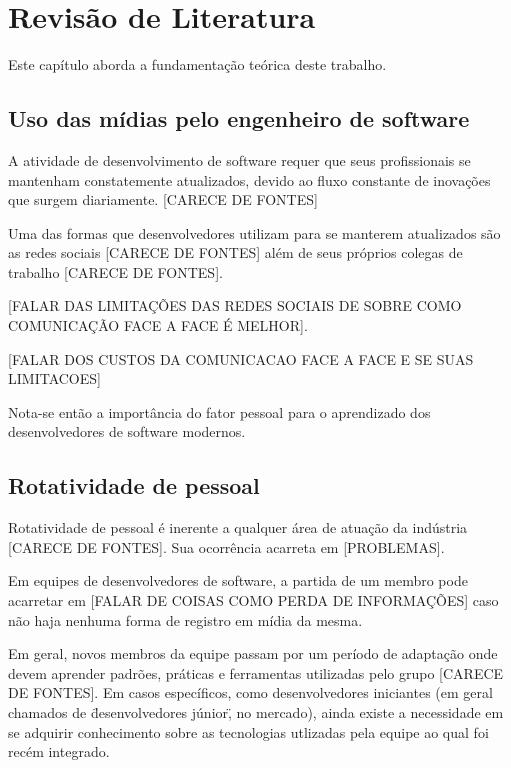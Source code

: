 \chapter{Revisão de Literatura}

Este capítulo aborda a fundamentação teórica deste trabalho.

\section{Uso das mídias pelo engenheiro de software}

A atividade de desenvolvimento de software requer que seus profissionais se mantenham constatemente atualizados, devido ao fluxo constante de inovações que surgem diariamente. [CARECE DE FONTES]

Uma das formas que desenvolvedores utilizam para se manterem atualizados são as redes sociais [CARECE DE FONTES] além de seus próprios colegas de trabalho [CARECE DE FONTES].

[FALAR DAS LIMITAÇÕES DAS REDES SOCIAIS DE SOBRE COMO COMUNICAÇÃO FACE A FACE É MELHOR].

[FALAR DOS CUSTOS DA COMUNICACAO FACE A FACE E SE SUAS LIMITACOES]

Nota-se então a importância do fator pessoal para o aprendizado dos desenvolvedores de software modernos.



\section{Rotatividade de pessoal}

Rotatividade de pessoal é inerente a qualquer área de atuação da indústria [CARECE DE FONTES]. Sua ocorrência acarreta em [PROBLEMAS].

Em equipes de desenvolvedores de software, a partida de um membro pode acarretar em [FALAR DE COISAS COMO PERDA DE INFORMAÇÕES] caso não haja nenhuma forma de registro em mídia da mesma.

Em geral, novos membros da equipe passam por um período de adaptação onde devem aprender padrões, práticas e ferramentas utilizadas pelo grupo [CARECE DE FONTES]. Em casos específicos, como desenvolvedores iniciantes (em geral chamados de \"desenvolvedores júnior\", no mercado), ainda existe a necessidade em se adquirir conhecimento sobre as tecnologias utlizadas pela equipe ao qual foi recém integrado.

